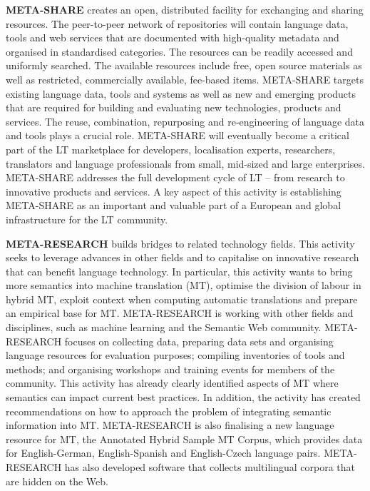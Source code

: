 \documentclass[]{../../metanetpaper}
\begin{document}
\begin{multicols}{2}
\textbf{META-SHARE} creates an open, distributed facility for exchanging and sharing resources. The peer-to-peer network of repositories will contain language data, tools and web services that are documented with high-quality metadata and organised in standardised categories. The resources can be readily accessed and uniformly searched. The available resources include free, open source materials as well as restricted, commercially available, fee-based items. META-SHARE targets existing language data, tools and systems as well as new and emerging products that are required for building and evaluating new technologies, products and services. The reuse, combination, repurposing and re-engineering of language data and tools plays a crucial role. META-SHARE will eventually become a critical part of the LT marketplace for developers, localisation experts, researchers, translators and language professionals from small, mid-sized and large enterprises. META-SHARE addresses the full development cycle of LT -- from research to innovative products and services. A key aspect of this activity is establishing META-SHARE as an important and valuable part of a European and global infrastructure for the LT community. 

\textbf{META-RESEARCH} builds bridges to related technology fields. This activity seeks to leverage advances in other fields and to capitalise on innovative research that can benefit language technology. In particular, this activity wants to bring more semantics into machine translation (MT), optimise the division of labour in hybrid MT, exploit context when computing automatic translations and prepare an empirical base for MT. META-RESEARCH is working with other fields and disciplines, such as machine learning and the Semantic Web community. META-RESEARCH focuses on collecting data, preparing data sets and organising language resources for evaluation purposes; compiling inventories of tools and methods; and organising workshops and training events for members of the community. This activity has already clearly identified aspects of MT where semantics can impact current best practices. In addition, the activity has created recommendations on how to approach the problem of integrating semantic information into MT. META-RESEARCH is also finalising a new language resource for MT, the Annotated Hybrid Sample MT Corpus, which provides data for English-German, English-Spanish and English-Czech language pairs. META-RESEARCH has also developed software that collects multilingual corpora that are hidden on the Web.
\end{multicols}
\end{document}
